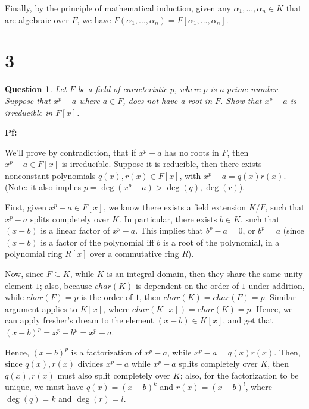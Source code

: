 \documentclass{article}
\newtheorem{question}{Question}
\begin{document}
\hfil

Finally, by the principle of mathematical induction, given any $\alpha_1,...,\alpha_n\in K$ that are algebraic over $F$, we have $F(\alpha_1,...,\alpha_n)=F[\alpha_1,...,\alpha_n]$.

\break

\section*{3}
\begin{myBox}[]{}
    \begin{question}
        Let $F$ be a field of caracteristic $p$, where $p$ is a prime number. Suppose that $x^p-a$ where $a\in F$, does not have a root in $F$. 
        Show that $x^p-a$ is irreducible in $F[x]$.
    \end{question}
\end{myBox}

\textbf{Pf:}

We'll prove by contradiction, that if $x^p-a$ has no roots in $F$, then $x^p-a\in F[x]$ is irreducible. Suppose it is reducible, then there exists nonconstant polynomials $q(x),r(x)\in F[x]$, with $x^p-a=q(x)r(x)$.
(Note: it also implies $p=\deg(x^p-a)>\deg(q),\deg(r)$).

\hfil

First, given $x^p-a\in F[x]$, we know there exists a field extension $K/F$, such that $x^p-a$ splits completely over $K$. In particular, there exists $b\in K$, such that $(x-b)$ is a linear factor of $x^p-a$.
This implies that $b^p-a=0$, or $b^p=a$ (since $(x-b)$ is a factor of the polynomial iff $b$ is a root of the polynomial, in a polynomial ring $R[x]$ over a commutative ring $R$).

Now, since $F\subseteq K$, while $K$ is an integral domain, then they share the same unity element $1$; also, because $char(K)$ is dependent on the order of $1$ under addition, while $char(F)=p$ is the order of $1$,
then $char(K)=char(F)=p$. Similar argument applies to $K[x]$, where $char(K[x])=char(K)=p$. Hence, we can apply fresher's dream to the element $(x-b)\in K[x]$,
and get that $(x-b)^p=x^p-b^p=x^p-a$.

Hence, $(x-b)^p$ is a factorization of $x^p-a$, while $x^p-a=q(x)r(x)$. Then, since $q(x),r(x)$ divides $x^p-a$ while $x^p-a$ splits completely over $K$, then $q(x),r(x)$ must also split completely over $K$; 
also, for the factorization to be unique, we must have $q(x)=(x-b)^k$ and $r(x)=(x-b)^l$, where $\deg(q)=k$ and $\deg(r)=l$.
\end{document}

